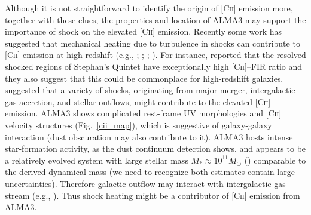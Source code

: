 \documentclass[apj]{emulateapj}
\begin{document}
Although it is not straightforward to identify the origin of \textsc{[Cii]} emission more, together with these clues, 
the properties and location of ALMA3 may support the importance of shock on the elevated \textsc{[Cii]} emission.
Recently some work has suggested that mechanical heating due to turbulence in shocks can contribute to \textsc{[Cii]} emission at high redshift (e.g., \citealt{2010ApJ...724..957S}; \citealt{2013A&A...550A.106L}; \citealt{2013ApJ...777...66A}; \citealt{2015ApJ...799...13B}).
For instance, \citet{2013ApJ...777...66A} reported that the resolved shocked regions of Stephan's Quintet have exceptionally high \textsc{[Cii]}--FIR ratio and they also suggest that this could be commonplace for high-redshift galaxies. 
\citet{2015ApJ...799...13B} suggested that a variety of shocks, originating from major-merger, intergalactic gas accretion, and stellar outflows, might contribute to the elevated \textsc{[Cii]} emission.
ALMA3 shows complicated rest-frame UV morphologies and \textsc{[Cii]} velocity structures (Fig.~\ref{cii_map}), which is suggestive of galaxy-galaxy interaction (dust obscuration may also contribute to it).
ALMA3 hosts intense star-formation activity, as the dust continuum detection shows, 
and appears to be a relatively evolved system with large stellar mass $M_*\approx10^{11} M_\odot$ 
(\citealt{2015ApJ...799...38K}) comparable to the derived dynamical mass (we need to recognize both estimates contain large uncertainties).
Therefore galactic outflow may interact with intergalactic gas stream (e.g., \citealt{2016arXiv160904405C}).
Thus shock heating might be a contributor of \textsc{[Cii]} emission from ALMA3.

\end{document}
